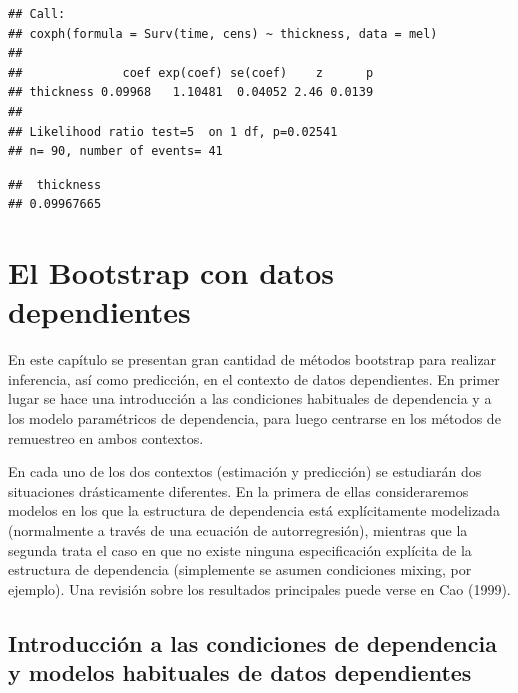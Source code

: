 \documentclass[]{book}
\newenvironment{Shaded}{\begin{snugshade}}{\end{snugshade}}
\newcommand{\CommentTok}[1]{\textcolor[rgb]{0.56,0.35,0.01}{\textit{#1}}}
\newcommand{\OperatorTok}[1]{\textcolor[rgb]{0.81,0.36,0.00}{\textbf{#1}}}
\newcommand{\NormalTok}[1]{#1}
\theoremstyle{definition}
\theoremstyle{definition}
\theoremstyle{definition}
\theoremstyle{remark}
\begin{document}
\begin{verbatim}
## Call:
## coxph(formula = Surv(time, cens) ~ thickness, data = mel)
## 
##              coef exp(coef) se(coef)    z      p
## thickness 0.09968   1.10481  0.04052 2.46 0.0139
## 
## Likelihood ratio test=5  on 1 df, p=0.02541
## n= 90, number of events= 41
\end{verbatim}

\begin{Shaded}
\end{Shaded}

\begin{verbatim}
##  thickness 
## 0.09967665
\end{verbatim}

\chapter{El Bootstrap con datos dependientes}\label{cap9}

En este capítulo se presentan gran cantidad de métodos bootstrap para
realizar inferencia, así como predicción, en el contexto de datos
dependientes. En primer lugar se hace una introducción a las condiciones
habituales de dependencia y a los modelo paramétricos de dependencia,
para luego centrarse en los métodos de remuestreo en ambos contextos.

En cada uno de los dos contextos (estimación y predicción) se estudiarán
dos situaciones drásticamente diferentes. En la primera de ellas
consideraremos modelos en los que la estructura de dependencia está
explícitamente modelizada (normalmente a través de una ecuación de
autorregresión), mientras que la segunda trata el caso en que no existe
ninguna especificación explícita de la estructura de dependencia
(simplemente se asumen condiciones mixing, por ejemplo). Una revisión
sobre los resultados principales puede verse en Cao (1999).

\section{Introducción a las condiciones de dependencia y modelos
habituales de datos
dependientes}\label{introduccion-a-las-condiciones-de-dependencia-y-modelos-habituales-de-datos-dependientes}
\end{document}
